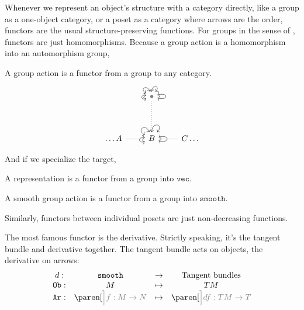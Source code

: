 \documentclass[a5paper]{scrartcl}
\def\veccat{\texttt{vec}}
\def\smooth{\texttt{smooth}}
\let\oldbullet\bullet
\def\bullet{\color{gray}\oldbullet}
\newcommand{\obj}{\texttt{Ob}}
\newcommand{\arr}{\texttt{Ar}}
\begin{document}
Whenever we represent an object's structure with a category directly, like a group as a one-object category, or a poset as a category where arrows are the order, functors are the usual structure-preserving functions.
For groups in the sense of , functors are just homomorphisms. Because a group action is a homomorphism into an automorphism group,
\begin{defn}\label{def-group-act}
  A group action is a functor from a group to any category.
  \[
    \begin{tikzcd}
      &\bullet \arrow[<->,loop right]{} \arrow[<->,loop, looseness=5, in=50, out=90]{}\arrow[<->,loop, looseness=5, in=110, out=150]{}\arrow[<->,loop, looseness=5, in=170, out=200]{} \ar[no head,dotted]{d}  \\[2em]
      \dots A \rar[lightgray]{}& B \arrow[<->,loop right]{} \arrow[<->,loop, looseness=5, in=50, out=90]{}\arrow[<->,loop, looseness=5, in=110, out=150]{}\arrow[<->,loop, looseness=5, in=170, out=200]{} & C\lar[lightgray]{} \dots
    \end{tikzcd}
  \]
\end{defn}
And if we specialize the target,
\begin{defn}[Representation]
  A representation is a functor from a group into \(\veccat\).
\end{defn}
\begin{defn}\label{def-smooth-act}
  A smooth group action is a functor from a group into \(\smooth\).
\end{defn}

Similarly, functors between individual posets are just non-decreasing functions.

The most famous functor is the derivative. Strictly speaking, it's the tangent bundle and derivative together. The tangent bundle acts on objects, the derivative on arrows:
\[
  \begin{matrix}
    d :& \smooth &\to & \text{Tangent bundles} \\
    \obj: & M & \mapsto & TM \\
    \arr: & \paren[\color{gray}\Big]{f: M \to N} & \mapsto & \paren[\color{gray}\Big]{df : TM \to T}
  \end{matrix}
\]
\end{document}
